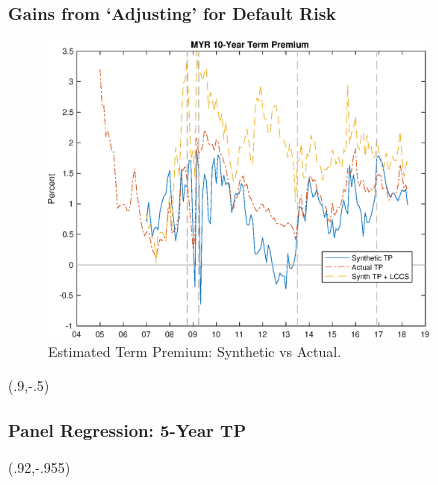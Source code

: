 \documentclass[12pt, xcolor=dvipsnames]{beamer} 			         %
\begin{document}
\begin{frame}
	\frametitle{Gains from `Adjusting' for Default Risk}
	\begin{figure}[!htbp]
		\begin{center}
			\includegraphics[width=0.9\textwidth,height=0.65\textheight]{../Figures/rp_cmp_10_MYR}
			\par\end{center}
		\caption{Estimated Term Premium: Synthetic vs Actual.}\label{fig:tp_comp_10yr}
	\end{figure}
\end{frame}

\begin{frame}
	
\end{frame}

\begin{frame}[label=corr_5yr]
	
	\begin{textblock*}{3cm}(.9\textwidth,-.5\textheight)
		\hyperlink{corr_10yr}{}
	\end{textblock*}
\end{frame}

\begin{frame}[label=pnl_tp5yr]
	\frametitle{Panel Regression: 5-Year TP}
	{\centering
	 \par}
	\begin{textblock*}{3cm}(.92\textwidth,-.955\textheight)
			\hyperlink{pnl_tp10yr}{}
	\end{textblock*}
\end{frame}
\end{document}
